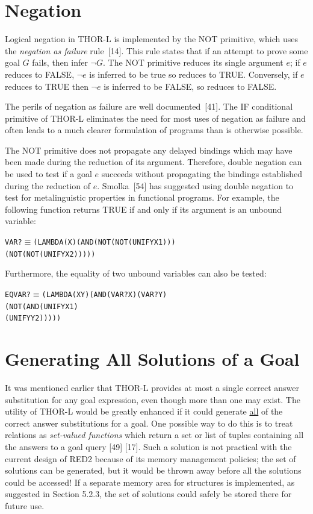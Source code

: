 \section{Negation}

Logical negation in THOR-L is implemented by the NOT primitive, which uses the
\emph{negation as failure} rule~[14]. This rule states that if an attempt to prove some
goal \(G\) fails, then infer \(\neg G\). The NOT primitive reduces its single
argument \(e\); if \(e\) reduces to FALSE, \(\neg e\) is inferred to be true so
 reduces to TRUE. Conversely, if \(e\) reduces to TRUE then
\(\neg e\) is inferred to be FALSE, so  reduces to FALSE.

The perils of negation as failure are well documented~[41]. The IF conditional
primitive of THOR-L eliminates the need for most uses of negation as failure and
often leads to a much clearer formulation of programs than is otherwise
possible.

The NOT primitive does not propagate any delayed bindings which may have been
made during the reduction of its argument. Therefore, double negation can be
used to test if a goal \(e\) succeeds without propagating the bindings
established during the reduction of \(e\). Smolka~[54] has suggested using
double negation to test for metalinguistic properties in functional programs.
For example, the following function returns TRUE if and only if its argument is
an unbound variable:
\begin{alltt}
VAR? \(\equiv\) (LAMBDA (X) (AND (NOT (NOT (UNIFY X 1)))
                       (NOT (NOT (UNIFY X 2)))))
\end{alltt}
Furthermore, the equality of two unbound variables can also be tested:
\begin{alltt}
EQVAR? \(\equiv\) (LAMBDA (X Y) (AND (VAR? X) (VAR? Y)
                            (NOT (AND (UNIFY X 1)
                                      (UNIFY Y 2)))))
\end{alltt}

\section{Generating All Solutions of a Goal}

It was mentioned earlier that THOR-L provides at most a single correct answer
substitution for any goal expression, even though more than one may exist. The
utility of THOR-L would be greatly enhanced if it could generate \underline{all} of the
correct answer substitutions for a goal. One possible way to do this is to treat
relations as \emph{set-valued functions} which return a set or list of tuples
containing all the answers to a goal query [49] [17]. Such a solution is not
practical with the current design of RED2 because of its memory management
policies; the set of solutions can be generated, but it would be thrown away
before all the solutions could be accessed! If a separate memory area for
structures is implemented, as suggested in Section 5.2.3, the set of solutions
could safely be stored there for future use.

